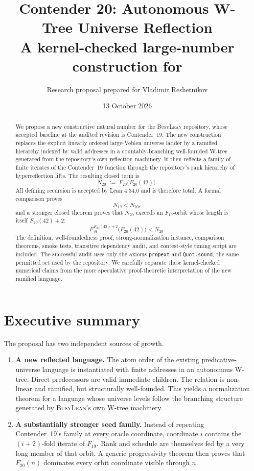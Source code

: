 \documentclass[11pt]{article}
\title{\bfseries Contender 20: Autonomous W-Tree Universe Reflection\\[0.45em]
\large A kernel-checked large-number construction for \textnormal{\BusyLean}}
\author{Research proposal prepared for Vladimir Reshetnikov}
\date{13 October 2026}
\theoremstyle{definition}
\theoremstyle{remark}
\newcommand{\BusyLean}{\textsc{BusyLean}}
\begin{document}
\maketitle

\begin{abstract}
We propose a new constructive natural number for the \BusyLean{} repository,
whose accepted baseline at the audited revision is Contender~19.  The new
construction replaces the explicit linearly ordered large-Veblen universe
ladder by a ramified hierarchy indexed by valid addresses in a
countably-branching well-founded W-tree generated from the repository's own
reflection machinery.  It then reflects a family of finite iterates of the
Contender~19 function through the repository's rank hierarchy of
hyperreflection lifts.  The resulting closed term is
\[
  N_{20} \;:=\; F_{20}\bigl(F_{20}(42)\bigr).
\]
All defining recursion is accepted by Lean 4.34.0 and is therefore total.  A
formal comparison proves
\[
  N_{19} < N_{20},
\]
and a stronger closed theorem proves that $N_{20}$ exceeds an $F_{19}$-orbit
whose length is itself $F_{20}(42)+2$:
\[
 F_{19}^{\,F_{20}(42)+2}\bigl(F_{20}(42)\bigr) < N_{20}.
\]
The definition, well-foundedness proof, strong-normalization instance,
comparison theorems, smoke tests, transitive dependency audit, and
contest-style timing script are included.  The successful audit uses only the
axioms \texttt{propext} and \texttt{Quot.sound}, the same permitted set used by
the repository.  We carefully separate these kernel-checked numerical claims
from the more speculative proof-theoretic interpretation of the new ramified
language.
\end{abstract}

\tableofcontents
\newpage

\section{Executive summary}

The proposal has two independent sources of growth.

\begin{enumerate}[leftmargin=2.2em]
\item \textbf{A new reflected language.}  The atom order of the existing
  predicative-universe language is instantiated with finite addresses in an
  autonomous W-tree.  Direct predecessors are valid immediate children.  The
  relation is non-linear and ramified, but structurally well-founded.  This
  yields a normalization theorem for a language whose universe levels follow
  the branching structure generated by \BusyLean's own W-tree machinery.

\item \textbf{A substantially stronger seed family.}  Instead of repeating
  Contender~19's family at every oracle coordinate, coordinate $i$ contains
  the $(i+2)$-fold iterate of $F_{19}$.  Rank and schedule are themselves fed
  by a very long member of that orbit.  A generic progressivity theorem then
  proves that $F_{20}(n)$ dominates every orbit coordinate visible through
  $n$.
\end{enumerate}
\end{document}
